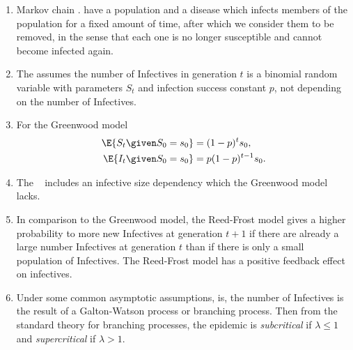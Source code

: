 \documentclass[12pt]{article}
\begin{document}
\begin{enumerate}
    \item
        Markov chain .
        have a population and a disease which infects members of the
        population for a fixed amount of time, after which we consider
        them to be removed, in the sense that each one is no longer
        susceptible and cannot become infected again.
    \item
        The  assumes the number of Infectives in
        generation \( t \) is a binomial random variable with parameters
        \( S_t \) and infection success constant \( p \), not depending
        on the number of Infectives.
    \item
        For the Greenwood model
        \begin{align*}
            \E{S_t \given S_0= s_0} &= (1-p)^t s_0, \\
            \E{I_t \given S_0= s_0} &= p(1-p)^{t-1} s_{0}.
        \end{align*}
    \item
        The ~%
        includes an infective size dependency which the Greenwood model
        lacks.
    \item
        In comparison to the Greenwood model, the Reed-Frost model gives
        a higher probability to more new Infectives at generation \( t+1
        \) if there are already a large number Infectives at generation \(
        t \) than if there is only a small population of Infectives. The
        Reed-Frost model has a positive feedback effect on infectives.
    \item
        Under some common asymptotic assumptions, is, the number of
        Infectives is the result of a Galton-Watson process or branching
        process.  Then from the standard theory for branching processes,
        the epidemic is \emph{subcritical} if \( \lambda \le 1 \) and
        \emph{supercritical} if \( \lambda > 1 \).
\end{enumerate}

\hr

\end{document}
